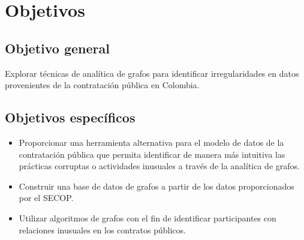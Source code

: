 \documentclass[11pt,letterpaper,oneside]{article}
\begin{document}
	\section{Objetivos}
		\subsection{Objetivo general}
		Explorar técnicas de analítica de grafos para identificar irregularidades en datos provenientes de la contratación pública en Colombia.	
		\subsection{Objetivos específicos}
		\begin{itemize}
		\item Proporcionar una herramienta alternativa para el modelo de datos de la contratación pública que permita identificar de manera más intuitiva las prácticas corruptas o actividades inusuales a través de la analítica de grafos.
		\item Construir una base de datos de grafos a partir de los datos proporcionados por el SECOP.
		\item Utilizar algoritmos de grafos con el fin de identificar participantes con relaciones inusuales en los contratos públicos.
		\end{itemize}
	
\end{document}
